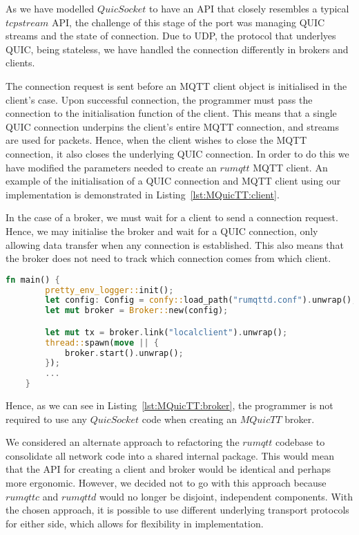 As we have modelled $QuicSocket$ to have an API that closely resembles a typical $tcpstream$ API, the challenge of this stage of the port was managing QUIC streams and the state of connection.
Due to UDP, the protocol that underlyes QUIC, being stateless, we have handled the connection differently in brokers and clients.

The connection request is sent before an MQTT client object is initialised in the client's case.
Upon successful connection, the programmer must pass the connection to the initialisation function of the client.
This means that a single QUIC connection underpins the client's entire MQTT connection, and streams are used for packets.
Hence, when the client wishes to close the MQTT connection, it also closes the underlying QUIC connection.
In order to do this we have modified the parameters needed to create an $rumqtt$ MQTT client.
An example of the initialisation of a QUIC connection and MQTT client using our implementation is demonstrated in Listing~\ref{lst:MQuicTT:client}.

In the case of a broker, we must wait for a client to send a connection request.
Hence, we may initialise the broker and wait for a QUIC connection, only allowing data transfer when any connection is established.
This also means that the broker does not need to track which connection comes from which client.

\begin{lstlisting}[language=Rust, caption={An example of initialising an MQuicTT broker. We can see that no operations with $QuiSocket$ are required for this initialisation as all QUIC operations are handled internally.}, label=lst:MQuicTT:broker]
    fn main() {
        pretty_env_logger::init();
        let config: Config = confy::load_path("rumqttd.conf").unwrap();
        let mut broker = Broker::new(config);

        let mut tx = broker.link("localclient").unwrap();
        thread::spawn(move || {
            broker.start().unwrap();
        });
        ...
    }

\end{lstlisting}

Hence, as we can see in Listing~\ref{lst:MQuicTT:broker}, the programmer is not required to use any $QuicSocket$ code when creating an $MQuicTT$ broker.

We considered an alternate approach to refactoring the $rumqtt$ codebase to consolidate all network code into a shared internal package.
This would mean that the API for creating a client and broker would be identical and perhaps more ergonomic.
However, we decided not to go with this approach because $rumqttc$ and $rumqttd$ would no longer be disjoint, independent components.
With the chosen approach, it is possible to use different underlying transport protocols for either side, which allows for flexibility in implementation.

